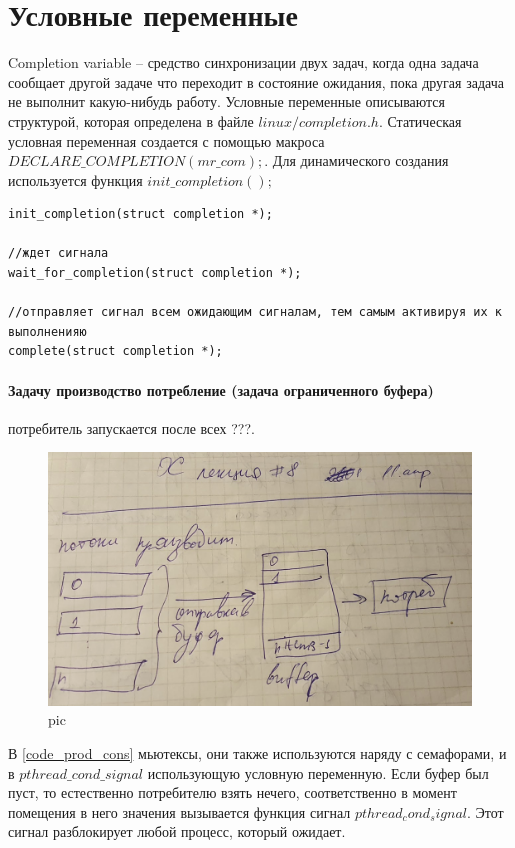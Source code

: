 \section{Условные переменные}

Completion variable – средство синхронизации двух задач, когда одна задача сообщает другой задаче что переходит в состояние ожидания, пока другая задача не выполнит какую-нибудь работу. Условные переменные описываются структурой, которая определена в файле $linux/completion.h$.
Статическая условная переменная создается с помощью макроса $DECLARE\_COMPLETION(mr\_com);$.
Для динамического создания используется функция $init\_completion();$ 

\begin{lstlisting}[caption=Функции для работы с условными переменными]
init_completion(struct completion *); 

//ждет сигнала
wait_for_completion(struct completion *);

//отправляет сигнал всем ожидающим сигналам, тем самым активируя их к выполненияю
complete(struct completion *);
\end{lstlisting}

\paragraph{Задачу производство потребление (задача ограниченного буфера)}

потребитель запускается после всех ???. 

\begin{figure}[H]
  \centering
  \includegraphics[width=\textwidth]{pic/1.png}
  \caption{pic}
\end{figure}

 

В \ref{code_prod_cons} мьютексы, они также используются наряду с семафорами, и в $pthread\_cond\_signal$ использующую условную переменную. Если буфер был пуст, то естественно потребителю взять нечего, соответственно в момент помещения в него значения вызывается функция сигнал $pthread_cond_signal$. Этот сигнал разблокирует любой процесс, который ожидает.
